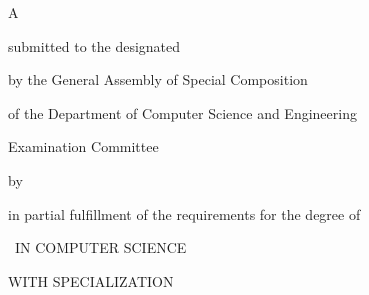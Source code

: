 \makeatletter

{\LARGE \@titleEn}

{\Large
    \vfill \vfill A \csethesisTypeEn

    \vfill        submitted to the designated

                  by the General Assembly of Special Composition

                  of the Department of Computer Science and Engineering

                  Examination Committee

    \vfill        by

    \vfill        {\LARGE \@authorEn}

    \vfill        in partial fulfillment of the requirements for the degree of

    \vfill        \MakeUppercase{\csediplwmaEn}\ifPhD\else\ IN COMPUTER SCIENCE

    \vspace{1em}  WITH SPECIALIZATION

                  \ekseidikseusiEn
    \fi

    \vfill \vfill \@dateEn
}

\makeatother
\clearpage
